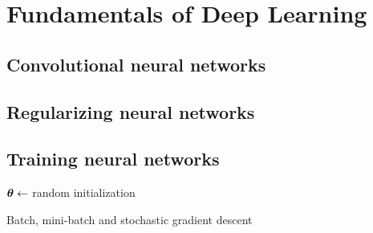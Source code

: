 %
%
%
%
%
\section{Fundamentals of Deep Learning}

\subsection{Convolutional neural networks}

\subsection{Regularizing neural networks}

\subsection{Training neural networks}
\label{subsec:nn_training}

\begin{algorithm}[H]
	\BlankLine
	$\boldsymbol{\theta} \gets$ random initialization\;
	\caption[Batch, mini-batch and stochastic gradient
	descent]{Batch, mini-batch and stochastic gradient descent \parencite{Bottou1998}}
\end{algorithm}

